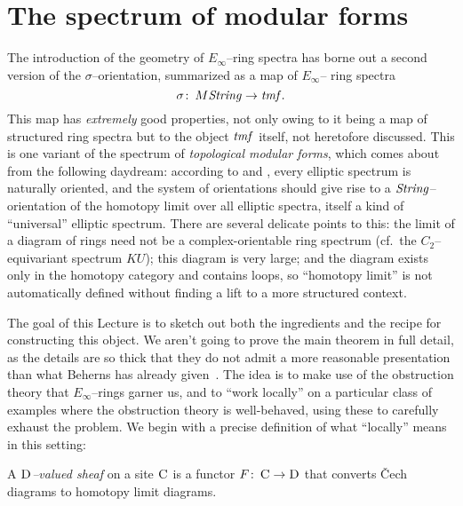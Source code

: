 \section{The spectrum of modular forms}\label{ConstructionOfTMFSection}

The introduction of the geometry of $E_\infty$--ring spectra has borne out a second version of the $\sigma$--orientation, summarized as a map of $E_\infty$-- ring spectra \[\sigma\colon\thinspace M\mathit{String} \to \mathit{tmf}.\]  This map has \emph{extremely} good properties, not only owing to it being a map of structured ring spectra but to the object $\mathit{tmf}$ itself, not heretofore discussed.  This is one variant of the spectrum of \textit{topological modular forms}, which comes about from the following daydream: according to  and , every elliptic spectrum is naturally oriented, and the system of orientations should give rise to a $\mathit{String}$--orientation of the homotopy limit over all elliptic spectra, itself a kind of ``universal'' elliptic spectrum.  There are several delicate points to this: the limit of a diagram of rings need not be a complex-orientable ring spectrum (cf.\ the $C_2$--equivariant spectrum $KU$); this diagram is very large; and the diagram exists only in the homotopy category and contains loops, so ``homotopy limit'' is not automatically defined without finding a lift to a more structured context.

The goal of this Lecture is to sketch out both the ingredients and the recipe for constructing this object.  We aren't going to prove the main theorem in full detail, as the details are so thick that they do not admit a more reasonable presentation than what Beherns has already given~\cite{BehrensConstruction}.  The idea is to make use of the obstruction theory that $E_\infty$--rings garner us, and to ``work locally'' on a particular class of examples where the obstruction theory is well-behaved, using these to carefully exhaust the problem.  We begin with a precise definition of what ``locally'' means in this setting:

\begin{definition}
A \textit{$\normalfont\textsc{D}$--valued sheaf} on a site $\normalfont\textsc{C}$ is a functor $F\colon\thinspace \normalfont\textsc{C} \to \normalfont\textsc{D}$ that converts \v{C}ech diagrams to homotopy limit diagrams.
\end{definition}

